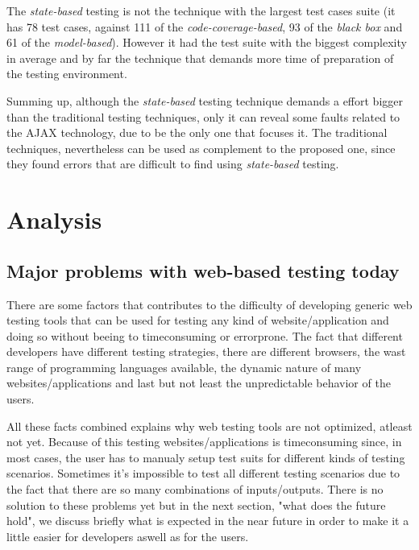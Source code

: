 \documentclass[a4paper, twocolumn]{ieee}
\begin{document}
The \emph{state-based} testing is not the technique with the largest test cases suite (it has 78 test cases, against 111 of the \emph{code-coverage-based}, 93 of the \emph{black box} and 61 of the \emph{model-based}).
However it had the test suite with the biggest complexity in average and by far the technique that demands more time of preparation of the testing environment.

Summing up, although the \emph{state-based} testing technique demands a effort bigger than the traditional testing techniques, only it can reveal some faults related to the AJAX technology, due to be the only one that focuses it.
The traditional techniques, nevertheless can be used as complement to the proposed one, since they found errors that are difficult to find using \emph{state-based} testing.


\section{Analysis}

\subsection{Major problems with web-based testing today}
There are some factors that contributes to the difficulty of developing
generic web testing tools that can be used for testing any kind of
website/application and doing so without beeing to timeconsuming or
errorprone. The fact that different developers have different testing
strategies, there are different browsers, the wast range of programming
languages available, the dynamic nature of many websites/applications and
last but not least the unpredictable behavior of the users. 

All these
facts combined explains why web testing tools are not optimized, atleast
not yet. Because of this testing websites/applications is timeconsuming
since, in most cases, the user has to manualy setup test suits for
different kinds of testing scenarios. Sometimes it's impossible to test
all different testing scenarios due to the fact that there are so many
combinations of inputs/outputs. There is no solution to these problems yet
but in the next section, "what does the future hold", we discuss briefly
what is expected in the near future in order to make it a little easier
for developers aswell as for the users. \cite{dlf07}
\end{document}
